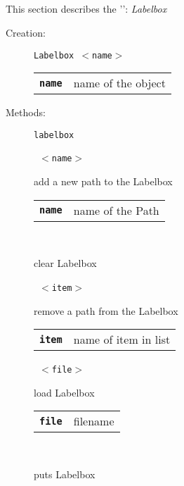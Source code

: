 
\subsection{}

This section describes the '': \textsl{Labelbox}

\begin{description}

  \item[Creation:] \texttt{Labelbox  $<$name$>$}


      \begin{tabular}{ll}
 \texttt{\textbf{name}} &    name of the object \\
      \end{tabular}

\vspace{3mm} \item[Methods:] \texttt{labelbox}

    \begin{description}
       \texttt{ $<$name$>$} \

        add a new path to the Labelbox

      \begin{tabular}{ll}
 \texttt{\textbf{name}} &  name of the Path  \\
      \end{tabular}
       \texttt{} \

        clear Labelbox

       \texttt{ $<$item$>$} \

        remove a path from the Labelbox

      \begin{tabular}{ll}
 \texttt{\textbf{item}} &  name of item in list  \\
      \end{tabular}
       \texttt{ $<$file$>$} \

        load Labelbox

      \begin{tabular}{ll}
 \texttt{\textbf{file}} &  filename  \\
      \end{tabular}
       \texttt{} \

        puts Labelbox


\end{description}
\end{description}

